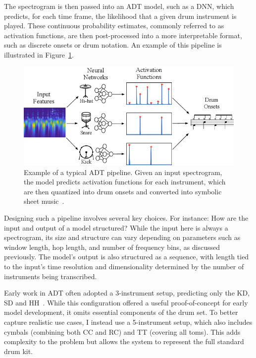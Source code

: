 The spectrogram is then passed into an \gls{ADT} model, such as a \gls{DNN}, which predicts, for each time frame, the likelihood that a given drum instrument is played. These continuous probability estimates, commonly referred to as activation functions, are then post-processed into a more interpretable format, such as discrete onsets or drum notation. An example of this pipeline is illustrated in Figure~\ref{ADTFigure}.

\begin{figure}[H]
    \centering
    \includegraphics[scale=0.7]{figures/adtpipeline.png}
    \caption{Example of a typical \gls{ADT} pipeline. Given an input spectrogram, the model predicts activation functions for each instrument, which are then quantized into drum onsets and converted into symbolic sheet music~\cite{Southall2016AutomaticDT}.}
    \label{ADTFigure}
\end{figure}

Designing such a pipeline involves several key choices. For instance: How are the input and output of a model structured? While the input here is always a spectrogram, its size and structure can vary depending on parameters such as window length, hop length, and number of frequency bins, as discussed previously. The model's output is also structured as a sequence, with length tied to the input's time resolution and dimensionality determined by the number of instruments being transcribed.

Early work in \gls{ADT} often adopted a 3-instrument setup, predicting only the \acrfull{KD}, \acrfull{SD} and \acrfull{HH}~\cite{vogl2016recurrent}. While this configuration offered a useful proof-of-concept for early model development, it omits essential components of the drum set. To better capture realistic use cases, I instead use a 5-instrument setup, which also includes cymbals (combining both \acrfull{CC} and \acrfull{RC}) and \acrfull{TT} (covering all toms). This adds complexity to the problem but allows the system to represent the full standard drum kit.


